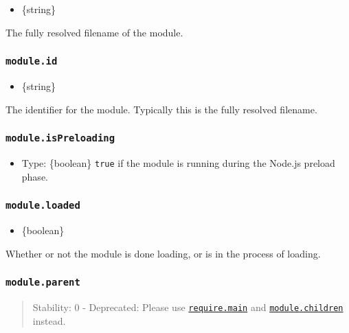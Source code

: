 \begin{itemize}
\tightlist
\item
  \{string\}
\end{itemize}

The fully resolved filename of the module.

\subsubsection{\texorpdfstring{\texttt{module.id}}{module.id}}\label{module.id}

\begin{itemize}
\tightlist
\item
  \{string\}
\end{itemize}

The identifier for the module. Typically this is the fully resolved
filename.

\subsubsection{\texorpdfstring{\texttt{module.isPreloading}}{module.isPreloading}}\label{module.ispreloading}

\begin{itemize}
\tightlist
\item
  Type: \{boolean\} \texttt{true} if the module is running during the
  Node.js preload phase.
\end{itemize}

\subsubsection{\texorpdfstring{\texttt{module.loaded}}{module.loaded}}\label{module.loaded}

\begin{itemize}
\tightlist
\item
  \{boolean\}
\end{itemize}

Whether or not the module is done loading, or is in the process of
loading.

\subsubsection{\texorpdfstring{\texttt{module.parent}}{module.parent}}\label{module.parent}

\begin{quote}
Stability: 0 - Deprecated: Please use
\hyperref[requiremain]{\texttt{require.main}} and
\hyperref[modulechildren]{\texttt{module.children}} instead.
\end{quote}

